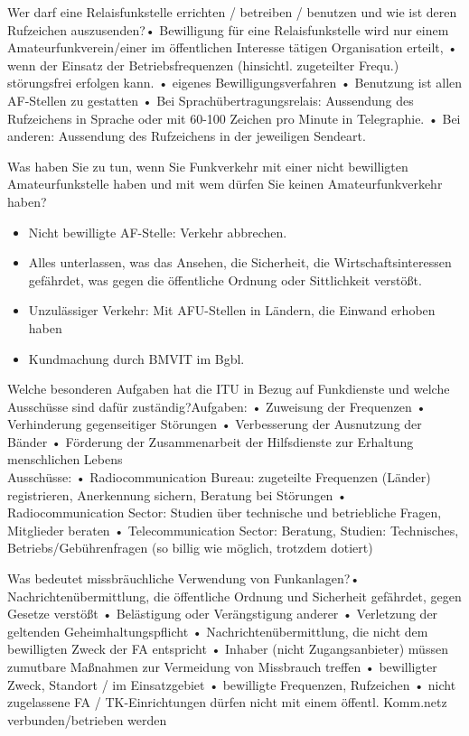 \documentclass[avery5371,grid,frame,a4paper]{flashcards}
\newcommand{\card}[3]{
  \begin{flashcard}[{\chap} -- #1]{#2}#3\end{flashcard}
}
\begin{document}
\card{52}{Wer darf eine Relaisfunkstelle errichten / betreiben / benutzen und wie ist deren Rufzeichen auszusenden?}{• Bewilligung für eine Relaisfunkstelle wird nur einem
Amateurfunkverein/einer im öffentlichen Interesse tätigen Organisation erteilt,
• wenn der Einsatz der Betriebsfrequenzen (hinsichtl. zugeteilter Frequ.) störungsfrei erfolgen kann.
• eigenes Bewilligungsverfahren
• Benutzung ist allen AF-Stellen zu gestatten
• Bei Sprachübertragungsrelais: Aussendung des Rufzeichens in Sprache oder mit 60-100 Zeichen pro Minute in Telegraphie.
• Bei anderen: Aussendung des Rufzeichens in der jeweiligen Sendeart.}

\card{53}{Was haben Sie zu tun, wenn Sie Funkverkehr mit einer nicht bewilligten Amateurfunkstelle haben und mit wem dürfen Sie keinen Amateurfunkverkehr haben?}{\begin{itemize} \item Nicht bewilligte AF-Stelle: Verkehr abbrechen. \item Alles unterlassen, was das Ansehen, die Sicherheit, die Wirtschaftsinteressen gefährdet, was gegen die öffentliche Ordnung oder Sittlichkeit verstößt. \item Unzulässiger Verkehr: Mit AFU-Stellen in Ländern, die Einwand erhoben haben \item Kundmachung durch BMVIT im Bgbl.\end{itemize}}

\card{54}{Welche besonderen Aufgaben hat die ITU in Bezug auf Funkdienste und welche Ausschüsse sind dafür zuständig?}{\small{Aufgaben:
•  Zuweisung der Frequenzen
•  Verhinderung gegenseitiger Störungen
•  Verbesserung der Ausnutzung der Bänder
•  Förderung der Zusammenarbeit der Hilfsdienste zur Erhaltung menschlichen Lebens \\
Ausschüsse:
•  Radiocommunication Bureau: zugeteilte Frequenzen (Länder) registrieren, Anerkennung sichern, Beratung bei Störungen
•  Radiocommunication Sector: Studien über technische und betriebliche Fragen, Mitglieder beraten
•  Telecommunication Sector: Beratung, Studien: Technisches, Betriebs/Gebührenfragen (so billig wie möglich, trotzdem dotiert)}}

\card{55}{Was bedeutet missbräuchliche Verwendung von Funkanlagen?}{\small{• Nachrichtenübermittlung, die öffentliche Ordnung und Sicherheit gefährdet, gegen Gesetze verstößt
• Belästigung oder Verängstigung anderer
• Verletzung der geltenden Geheimhaltungspflicht
• Nachrichtenübermittlung, die nicht dem bewilligten Zweck der FA entspricht
• Inhaber (nicht Zugangsanbieter) müssen zumutbare Maßnahmen zur Vermeidung von Missbrauch treffen
• bewilligter Zweck, Standort / im Einsatzgebiet
• bewilligte Frequenzen, Rufzeichen
• nicht zugelassene FA / TK-Einrichtungen dürfen nicht mit einem öffentl. Komm.netz verbunden/betrieben werden}}
\end{document}
